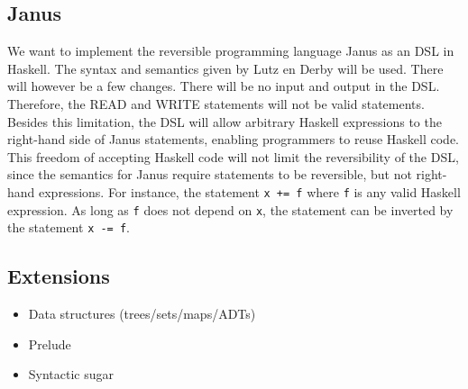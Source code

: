 \documentclass[12pt,a4paper]{article}
\newcommand{\code}[1]{\texttt{#1}}
\begin{document}
	\subsection{Janus}
	We want to implement the reversible programming language Janus as an DSL in Haskell. The syntax and semantics given by Lutz en Derby \cite{lutz82} will be used. There will however be a few changes. There will be no input and output in the DSL. Therefore, the READ and WRITE statements will not be valid statements. Besides this limitation, the DSL will allow arbitrary Haskell expressions to the right-hand side of Janus statements, enabling programmers to reuse Haskell code. This freedom of accepting Haskell code will not limit the reversibility of the DSL, since the semantics for Janus require statements to be reversible, but not right-hand expressions. For instance, the statement \code{x += f} where \code{f} is any valid Haskell expression. As long as \code{f} does not depend on \code{x}, the statement can be inverted by the statement \code{x -= f}.
	
	\subsection{Extensions}
	\begin{itemize}
		\item{Data structures (trees/sets/maps/ADTs)}
		\item{Prelude}
		\item{Syntactic sugar}
	\end{itemize}
	
\end{document}
